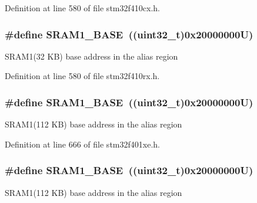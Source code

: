 Definition at line 580 of file stm32f410cx.\+h.

\subsubsection[{\texorpdfstring{S\+R\+A\+M1\+\_\+\+B\+A\+SE}{SRAM1_BASE}}]{\setlength{\rightskip}{0pt plus 5cm}\#define S\+R\+A\+M1\+\_\+\+B\+A\+SE~((uint32\+\_\+t)0x20000000\+U)}\hypertarget{group___peripheral__registers__structures_ga7d0fbfb8894012dbbb96754b95e562cd}{}\label{group___peripheral__registers__structures_ga7d0fbfb8894012dbbb96754b95e562cd}
S\+R\+A\+M1(32 K\+B) base address in the alias region 

Definition at line 580 of file stm32f410rx.\+h.

\subsubsection[{\texorpdfstring{S\+R\+A\+M1\+\_\+\+B\+A\+SE}{SRAM1_BASE}}]{\setlength{\rightskip}{0pt plus 5cm}\#define S\+R\+A\+M1\+\_\+\+B\+A\+SE~((uint32\+\_\+t)0x20000000\+U)}\hypertarget{group___peripheral__registers__structures_ga7d0fbfb8894012dbbb96754b95e562cd}{}\label{group___peripheral__registers__structures_ga7d0fbfb8894012dbbb96754b95e562cd}
S\+R\+A\+M1(112 K\+B) base address in the alias region 

Definition at line 666 of file stm32f401xe.\+h.

\subsubsection[{\texorpdfstring{S\+R\+A\+M1\+\_\+\+B\+A\+SE}{SRAM1_BASE}}]{\setlength{\rightskip}{0pt plus 5cm}\#define S\+R\+A\+M1\+\_\+\+B\+A\+SE~((uint32\+\_\+t)0x20000000\+U)}\hypertarget{group___peripheral__registers__structures_ga7d0fbfb8894012dbbb96754b95e562cd}{}\label{group___peripheral__registers__structures_ga7d0fbfb8894012dbbb96754b95e562cd}
S\+R\+A\+M1(112 K\+B) base address in the alias region 

